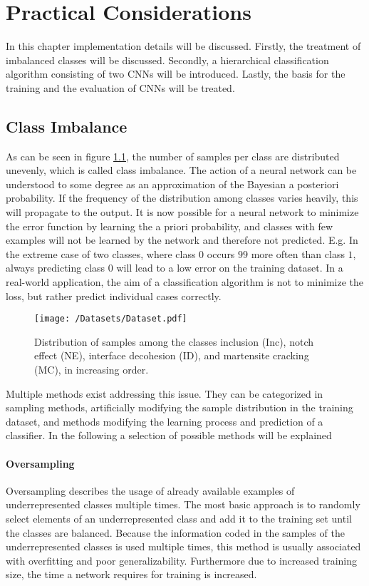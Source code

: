 \chapter{Practical Considerations}
\label{cha:PracticalConsiderations}

In this chapter implementation details will be discussed. Firstly, the treatment of imbalanced classes will be discussed. Secondly, a hierarchical classification algorithm consisting of two CNNs will be introduced. Lastly, the basis for the training and the evaluation of CNNs will be treated.

\section{Class Imbalance}

As can be seen in figure \ref{fig:datasets}, the number of samples per class are distributed unevenly, which is called class imbalance. The action of a neural network can be understood to some degree as an approximation of the Bayesian a posteriori probability. If the frequency of the distribution among classes varies heavily, this will propagate to the output. It is now possible for a neural network to minimize the error function by learning the a priori probability, and classes with few examples will not be learned by the network and therefore not predicted. E.g. In the extreme case of two classes, where class $0$ occurs $99$ more often than class $1$, always predicting class $0$ will lead to a low error on the training dataset. In a real-world application, the aim of a classification algorithm is not to minimize the loss, but rather predict individual cases correctly.\\

\begin{figure}[H]
\centering
\texttt{[image: /Datasets/Dataset.pdf]}
\caption{Distribution of samples among the classes inclusion (Inc), notch effect (NE), interface decohesion (ID), and martensite cracking (MC), in increasing order.}
\label{fig:datasets}
\end{figure}

Multiple methods exist addressing this issue. They can be categorized in sampling methods, artificially modifying the sample distribution in the training dataset, and methods modifying the learning process and prediction of a classifier. In the following a selection of possible methods will be explained

\subsubsection{Oversampling}
Oversampling describes the usage of already available examples of underrepresented classes multiple times. The most basic approach is to randomly select elements of an underrepresented class and add it to the training set until the classes are balanced. Because the information coded in the samples of the underrepresented classes is used multiple times, this method is usually associated with overfitting and poor generalizability. Furthermore due to increased training size, the time a network requires for training is increased. 

